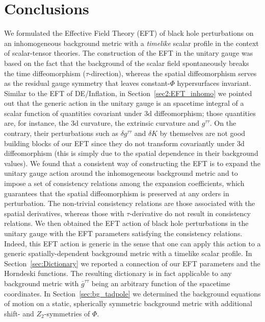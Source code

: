 \documentclass[a4paper,11pt]{article}
\numberwithin{equation}{section}
\begin{document}
\section{Conclusions} \label{sec:conclusions}
We formulated the Effective Field Theory (EFT) of black hole perturbations on an inhomogeneous background metric with a \textit{timelike} scalar profile in the context of scalar-tensor theories. The construction of the EFT in the unitary gauge was based on the fact that the background of the scalar field spontaneously breaks the time diffeomorphism ($\tau$-direction), whereas the spatial diffeomorphism serves as the residual gauge symmetry that leaves constant-$\Phi$ hypersurfaces invariant. Similar to the EFT of DE/Inflation, in Section~\ref{sec2:EFT_inhomo} we pointed out that the generic action in the unitary gauge is an spacetime integral of a scalar function of quantities covariant under 3d diffeomorphism; those quantities are, for instance, the 3d curvature, the extrinsic curvature and $g^{\tau\tau}$. On the contrary, their perturbations such as $\delta g^{\tau\tau}$ and $\delta K$ by themselves are not good building blocks of our EFT since they do not transform covariantly under 3d diffeomorphism (this is simply due to the spatial dependence in their background values). We found that a consistent way of constructing the EFT is to expand the unitary gauge action around the inhomogeneous background metric and to impose a set of consistency relations among the expansion coefficients, which guarantees  that the spatial diffeomorphism is preserved at any orders in perturbation. The non-trivial consistency relations are those associated with the spatial derivatives, whereas those with $\tau$-derivative do not result in consistency relations. We then obtained the EFT action of black hole perturbations in the unitary gauge with the EFT parameters satisfying the consistency relations. Indeed, this EFT action is generic in the sense that one can apply this action to a generic spatially-dependent background metric with a timelike scalar profile. In Section~\ref{sec:Dictionary} we reported a connection of our EFT parameters and the Horndeski functions. The resulting dictionary is in fact applicable to any background metric with $\bar{g}^{\tau\tau}$ being an arbitrary function of the spacetime coordinates. In Section~\ref{sec:bg_tadpole} we determined the background equations of motion on a static, spherically symmetric background metric with additional shift- and $Z_2$-symmetries of $\Phi$. 
\end{document}
